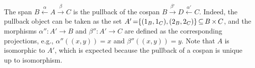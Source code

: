 \begin{example}
\begin{center}
{
      }
    \end{center} 
    The span \( B \overset{\alpha}{\leftarrow} A \overset{\beta}{\rightarrow} C \)
    is the pullback of the cospan \(B \overset{\beta'}{\rightarrow} D \overset{\alpha'}{\leftarrow} C \).
    Indeed, the pullback object can be taken as the set $A' \mathop{=} \{(1_B,1_C),(2_B,2_C)\} \mathop{\subseteq} B \mathop{\times} C$, and the morphisms $\alpha'' \mathop{\colon} A'  \mathop{\to} B$ and $\beta'' \mathop{\colon} A'  \mathop{\to} C$ are defined as the corresponding projections, e.g., $\alpha''((x,y)) \mathop{=} x$ and $\beta''((x,y)) \mathop{=} y$. Note that $A$ is isomorphic to $A'$, which is expected because the pullback of a cospan is unique up to isomorphism.
\end{example}

